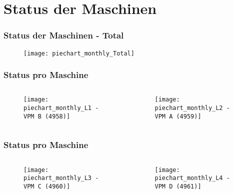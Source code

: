 \section{Status der Maschinen}
\begin{frame}
    \frametitle{Status der Maschinen - Total}

    \begin{figure}
        \centering
        \texttt{[image: piechart\_monthly\_Total]}
    \end{figure}

\end{frame}

\begin{frame}
    \frametitle{Status pro Maschine}

    \begin{columns}[t]
        \begin{column}{0.48\linewidth}
            \begin{figure}
                \centering
                \texttt{[image: piechart\_monthly\_L1 - VPM B (4958)]}
            \end{figure}
        \end{column}
        \begin{column}{0.48\linewidth}
            \begin{figure}
                \centering
                \texttt{[image: piechart\_monthly\_L2 - VPM A (4959)]}
            \end{figure}
        \end{column}
    \end{columns}

\end{frame}

\begin{frame}
    \frametitle{Status pro Maschine}

    \begin{columns}[t]
        \begin{column}{0.48\linewidth}
            \begin{figure}
                \centering
                \texttt{[image: piechart\_monthly\_L3 - VPM C (4960)]}
            \end{figure}
        \end{column}
        \begin{column}{0.48\linewidth}
            \begin{figure}
                \centering
                \texttt{[image: piechart\_monthly\_L4 - VPM D (4961)]}
            \end{figure}
        \end{column}
    \end{columns}

\end{frame}